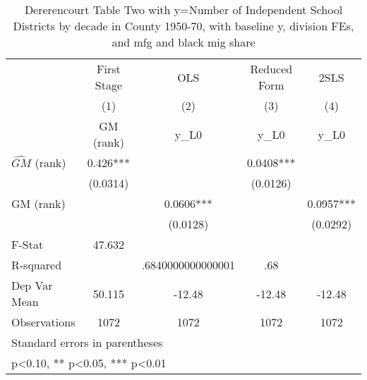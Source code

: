 \begin{table}[htbp]\centering
\def\sym#1{\ifmmode^{#1}\else\(^{#1}\)\fi}
\caption{Dererencourt Table Two with y=Number of Independent School Districts by decade in County 1950-70, with baseline y, division FEs, and mfg and black mig share}
\begin{tabular}{l*{4}{c}}
\toprule
                    & First Stage   &         OLS   &Reduced Form   &        2SLS   \\
                    &\multicolumn{1}{c}{(1)}&\multicolumn{1}{c}{(2)}&\multicolumn{1}{c}{(3)}&\multicolumn{1}{c}{(4)}\\
                    &\multicolumn{1}{c}{GM  (rank)}&\multicolumn{1}{c}{y\_L0}&\multicolumn{1}{c}{y\_L0}&\multicolumn{1}{c}{y\_L0}\\
\midrule
$\hat{GM}$ (rank)   &       0.426***&               &      0.0408***&               \\
                    &    (0.0314)   &               &    (0.0126)   &               \\
\addlinespace
GM  (rank)          &               &      0.0606***&               &      0.0957***\\
                    &               &    (0.0128)   &               &    (0.0292)   \\
\midrule
F-Stat              &      47.632   &               &               &               \\
R-squared           &               &.6840000000000001   &         .68   &               \\
Dep Var Mean        &      50.115   &      -12.48   &      -12.48   &      -12.48   \\
Observations        &        1072   &        1072   &        1072   &        1072   \\
\bottomrule
\multicolumn{5}{l}{\footnotesize Standard errors in parentheses}\\
\multicolumn{5}{l}{\footnotesize * p<0.10, ** p<0.05, *** p<0.01}\\
\end{tabular}
\end{table}
